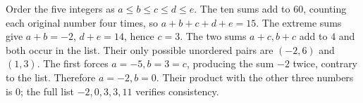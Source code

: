 Order the five integers as $a\le b\le c\le d\le e$. The ten sums add to $60$, counting each original number four times, so $a+b+c+d+e=15$. The extreme sums give $a+b=-2$, $d+e=14$, hence $c=3$. The two sums $a+c,b+c$ add to $4$ and both occur in the list. Their only possible unordered pairs are $(-2,6)$ and $(1,3)$. The first forces $a=-5,b=3=c$, producing the sum $-2$ twice, contrary to the list. Therefore $a=-2,b=0$. Their product with the other three numbers is $\boxed0$; the full list $-2,0,3,3,11$ verifies consistency.
